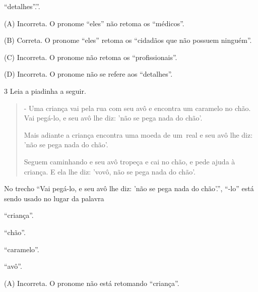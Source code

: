 \begin{escolha}
\begin{escolha}
\item ``detalhes''.''.
\end{escolha}


(A) Incorreta. O pronome ``eles'' não retoma os ``médicos''.

(B) Correta. O pronome ``eles'' retoma os ``cidadãos que não possuem
ninguém''.

(C) Incorreta. O pronome não retoma os ``profissionais''.

(D) Incorreta. O pronome não se refere aos ``detalhes''.

\num{3} Leia a piadinha a seguir.

\begin{quote}
- Uma criança vai pela rua com seu avô e encontra um caramelo no chão.
Vai pegá-lo, e seu avô lhe diz: 'não se pega nada do chão'.

Mais adiante a criança encontra uma moeda de um~real e seu avô lhe diz:
'não se pega nada do chão'.~

Seguem caminhando e seu avô tropeça e cai no chão, e pede ajuda à
criança. E ela lhe diz: 'vovô, não se pega nada do chão'.
\end{quote}


No trecho ``Vai pegá-lo, e seu avô lhe diz: 'não se pega nada do
chão'.'', ``-lo'' está sendo usado no lugar da palavra

\begin{escolha}
\item ``criança''.

\item ``chão''.

\item ``caramelo''.

\item ``avô''.
\end{escolha}


(A) Incorreta. O pronome não está retomando ``criança''.


\end{escolha}
